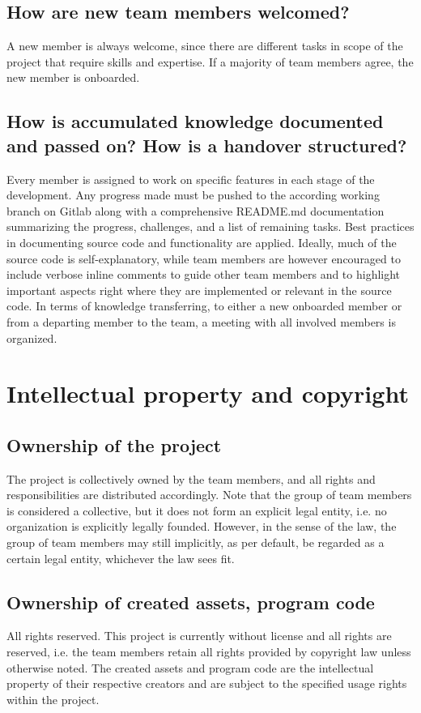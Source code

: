 \documentclass{article}
\begin{document}
\subsection{How are new team members welcomed?}
A new member is always welcome, since there are different tasks in scope of the project that require skills and expertise.
If a majority of team members agree, the new member is onboarded.
\subsection{How is accumulated knowledge documented and passed on? How is a handover structured?}
Every member is assigned to work on specific features in each stage of the development.
Any progress made must be pushed to the according working branch on Gitlab along with a comprehensive README.md documentation summarizing the progress, challenges, and a list of remaining tasks.
Best practices in documenting source code and functionality are applied.
Ideally, much of the source code is self-explanatory, while team members are however encouraged to include verbose inline comments to guide other team members and to highlight important aspects right where they are implemented or relevant in the source code.
In terms of knowledge transferring, to either a new onboarded member or from a departing member to the team, a meeting with all involved members is organized.

\section{Intellectual property and copyright}
\subsection{Ownership of the project}
The project is collectively owned by the team members, and all rights and responsibilities are distributed accordingly.
Note that the group of team members is considered a collective, but it does not form an explicit legal entity, i.e. no organization is explicitly legally founded.
However, in the sense of the law, the group of team members may still implicitly, as per default, be regarded as a certain legal entity, whichever the law sees fit.
\subsection{Ownership of created assets, program code}
All rights reserved.
This project is currently without license and all rights are reserved, i.e. the team members retain all rights provided by copyright law unless otherwise noted.
The created assets and program code are the intellectual property of their respective creators and are subject to the specified usage rights within the project.
\end{document}
